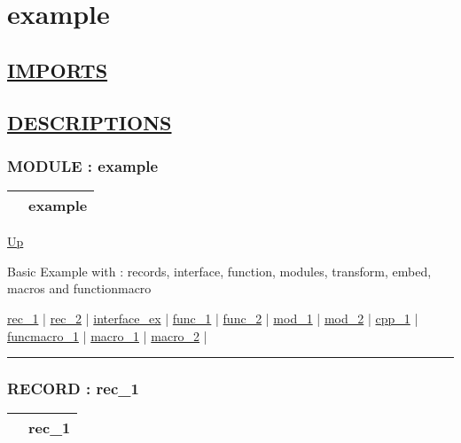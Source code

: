 \chapter*{example}
\hypertarget{ecldoc:toc:example}{}

\section*{\underline{IMPORTS}}

\section*{\underline{DESCRIPTIONS}}
\subsection*{MODULE : example}
\hypertarget{ecldoc:example}{}

{\renewcommand{\arraystretch}{1.5}
\begin{tabularx}{\textwidth}{|>{\raggedright\arraybackslash}l|X|}
\hline
\hspace{0pt} & example \\
\hline
\end{tabularx}
}

\hyperlink{ecldoc:toc:root}{Up}

\par
Basic Example with : records, interface, function, modules, transform, embed, macros and functionmacro


\hyperlink{ecldoc:example.rec_1}{rec\_1}  |
\hyperlink{ecldoc:example.rec_2}{rec\_2}  |
\hyperlink{ecldoc:example.interface_ex}{interface\_ex}  |
\hyperlink{ecldoc:example.func_1}{func\_1}  |
\hyperlink{ecldoc:example.func_2}{func\_2}  |
\hyperlink{ecldoc:example.mod_1}{mod\_1}  |
\hyperlink{ecldoc:example.mod_2}{mod\_2}  |
\hyperlink{ecldoc:example.cpp_1}{cpp\_1}  |
\hyperlink{ecldoc:example.funcmacro_1}{funcmacro\_1}  |
\hyperlink{ecldoc:example.macro_1}{macro\_1}  |
\hyperlink{ecldoc:example.macro_2}{macro\_2}  |

\rule{\textwidth}{0.4pt}

\subsection*{RECORD : rec\_1}
\hypertarget{ecldoc:example.rec_1}{}

{\renewcommand{\arraystretch}{1.5}
\begin{tabularx}{\textwidth}{|>{\raggedright\arraybackslash}l|X|}
\hline
\hspace{0pt} & rec\_1 \\
\hline
\end{tabularx}
}


